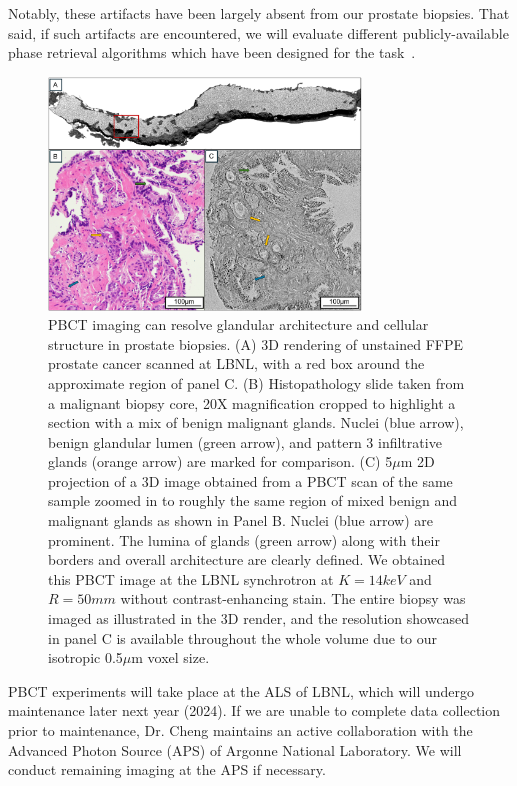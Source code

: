 \documentclass{NIHGrant}
\theoremstyle{theorem}
\begin{document}
Notably, these
artifacts have been largely absent from our prostate biopsies. That said, if
such artifacts are encountered, we will evaluate different publicly-available
phase retrieval algorithms which have been designed for the
task~\cite{mohan_non-linear_2023}.

\begin{figure}
  \vspace{-0.5cm} \includegraphics[width=0.74\textwidth]{ ./figures/fig1_resub.png }
  \caption{ PBCT imaging can resolve glandular architecture and cellular structure in prostate biopsies.
    (A) 3D rendering of unstained FFPE prostate cancer scanned at LBNL, with a red box around the approximate region of panel C. (B) Histopathology slide taken from a malignant biopsy core, 20X
    magnification cropped to highlight a section with a mix of benign malignant glands. Nuclei
    (blue arrow), benign glandular lumen (green arrow), and pattern 3 infiltrative glands (orange arrow) are marked for comparison. (C) 5$\mu$m
    2D projection of a 3D image obtained from a PBCT scan of the same sample
    zoomed in to roughly the same region of mixed benign and malignant glands as shown in Panel
    B. Nuclei (blue arrow) are prominent. The lumina of glands (green arrow)
    along with their borders and overall architecture are clearly defined. We obtained this PBCT image at
    the LBNL synchrotron at \(K=14keV\) and
    \(R=50mm\) without contrast-enhancing stain. The entire biopsy was
    imaged as illustrated in the 3D render, and the resolution showcased in panel C is available throughout the whole volume due to our isotropic 0.5$\mu$m voxel size.}\label{fig:match_histo}
\end{figure}

PBCT experiments will take place at the ALS of LBNL, which will undergo maintenance later next year (2024). If we are unable to complete data collection prior to maintenance, Dr. Cheng maintains an active collaboration with the Advanced Photon Source (APS) of Argonne National Laboratory. We will conduct remaining imaging at the APS if necessary.
\end{document}
